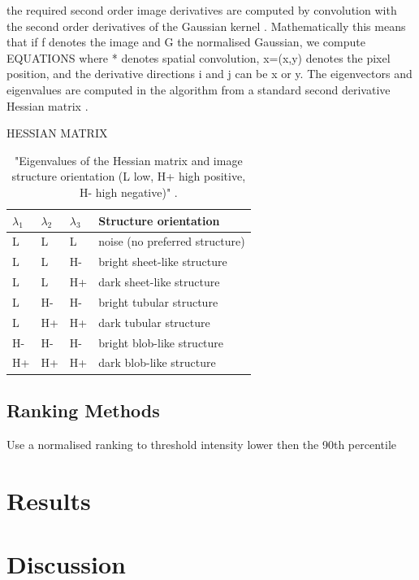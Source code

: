 the required second order image derivatives are computed by convolution with the second order derivatives of the Gaussian kernel \citep{lindeberg1994linear}. Mathematically this means that if f denotes the image and G the normalised Gaussian, we compute
EQUATIONS
where * denotes spatial convolution, x=(x,y) denotes the pixel position, and the derivative directions i and j can be x or y. The eigenvectors and eigenvalues are computed in the algorithm from a standard second derivative Hessian matrix \citep{meijering2004design}.

HESSIAN MATRIX

\begin{table}[h]
\centering
\caption{"Eigenvalues of the Hessian matrix and image structure
orientation (L low, H+ high positive, H- high negative)" \citep{rudzki2009vessel}.}
\begin{tabular}{@{}llll@{}}
\toprule
$\lambda_1$ & $\lambda_2$ & $\lambda_3$ & Structure orientation          \\ \midrule
L           & L           & L           & noise (no preferred structure) \\
L           & L           & H-          & bright sheet-like structure    \\
L           & L           & H+          & dark sheet-like structure      \\
L           & H-          & H-          & bright tubular structure       \\
L           & H+          & H+          & dark tubular structure         \\
H-          & H-          & H-          & bright blob-like structure     \\
H+          & H+          & H+          & dark blob-like structure       \\ \bottomrule
\end{tabular}
\end{table}

\subsection{Ranking Methods}
Use a normalised ranking to threshold intensity lower then the 90th percentile 

\newpage
\section{Results}

\newpage
\section{Discussion}

